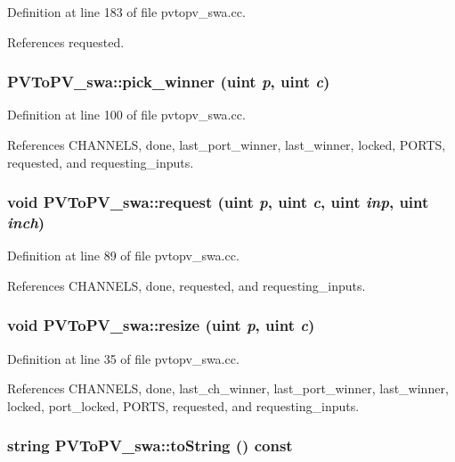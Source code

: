 Definition at line 183 of file pvtopv\_\-swa.cc.

References requested.
\subsubsection[{pick\_\-winner}]{ PVToPV\_\-swa::pick\_\-winner ({\bf uint} {\em p}, \/  {\bf uint} {\em c})}\label{classPVToPV__swa_957d1cb1cd6ffa264749dd89e2ae1cd1}




Definition at line 100 of file pvtopv\_\-swa.cc.

References CHANNELS, done, last\_\-port\_\-winner, last\_\-winner, locked, PORTS, requested, and requesting\_\-inputs.
\subsubsection[{request}]{\setlength{\rightskip}{0pt plus 5cm}void PVToPV\_\-swa::request ({\bf uint} {\em p}, \/  {\bf uint} {\em c}, \/  {\bf uint} {\em inp}, \/  {\bf uint} {\em inch})}\label{classPVToPV__swa_d0090325f9ce86b633ddc400910ad30c}




Definition at line 89 of file pvtopv\_\-swa.cc.

References CHANNELS, done, requested, and requesting\_\-inputs.
\subsubsection[{resize}]{\setlength{\rightskip}{0pt plus 5cm}void PVToPV\_\-swa::resize ({\bf uint} {\em p}, \/  {\bf uint} {\em c})}\label{classPVToPV__swa_f3763d9d6f2c33078a4b0dbe414f4724}




Definition at line 35 of file pvtopv\_\-swa.cc.

References CHANNELS, done, last\_\-ch\_\-winner, last\_\-port\_\-winner, last\_\-winner, locked, port\_\-locked, PORTS, requested, and requesting\_\-inputs.
\subsubsection[{toString}]{\setlength{\rightskip}{0pt plus 5cm}string PVToPV\_\-swa::toString () const}\label{classPVToPV__swa_c0517af81f551c91f98f44dd0d6f257f}




